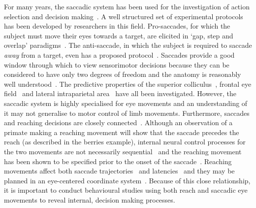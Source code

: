 \documentclass[10pt,letterpaper]{article}
\begin{document}
For many years, the saccadic system has been used for the
investigation of action selection and decision
making~\cite{deubel_saccade_1996,mcpeek_saccade_2002,carpenter_contrast_2004,rorie_integration_2010,bompas_saccadic_2011,reppert_modulation_2015}. A
well structured set of experimental protocols has been developed by
researchers in this field. Pro-saccades, for which the subject must
move their eyes towards a target, are elicited in `gap, step and
overlap' paradigms~\cite{saslow_effects_1967}. The anti-saccade, in
which the subject is required to saccade \emph{away} from a target,
even has a proposed
protocol~\cite{antoniades_internationally_2013}. Saccades provide a
good window through which to view sensorimotor decisions because they
can be considered to have only two degrees of freedom and the anatomy
is reasonably well
understood~\cite{moschovakis_anatomy_1994,moschovakis_microscopic_1996,sparks_brainstem_2002}.
The predictive properties of the superior
colliculus~\cite{ratcliff_comparison_2003}, frontal eye
field~\cite{schall_neural_1993} and lateral intraparietal
area~\cite{hanks_microstimulation_2006,rorie_integration_2010} have
all been investigated.  However, the saccadic system is highly
specialised for eye movements and an understanding of it may not
generalise to motor control of limb movements. Furthermore, saccades
and reaching decisions are closely
connected~\cite{gribble_hand-eye_2002}. Although an observation of a
primate making a reaching movement will show that the saccade precedes
the reach (as described in the berries example), internal neural
control processes for the two movements are not necessarily
sequential~\cite{carey_eyehand_2000} and the reaching movement has
been shown to be specified prior to the onset of the
saccade~\cite{gribble_hand-eye_2002}. Reaching movements affect both
saccade trajectories~\cite{tipper_reaching_2001} and
latencies~\cite{fisk_organization_1985,neggers_ocular_2000,snyder_eye-hand_2002}
and they may be planned in an eye-centered coordinate
system~\cite{batista_reach_1999,tipper_reaching_2001}. Because of this
close relationship, it is important to conduct behavioural studies
using both reach and saccadic eye movements to reveal internal,
decision making processes.
\end{document}
